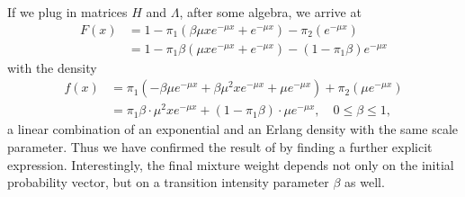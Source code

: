 \documentclass[11pt]{article}
\begin{document}
If we plug in matrices $H$ and $\Lambda$, after some algebra, we arrive at
\begin{align} 
\nonumber    F(x)&=1-\pi_1(\beta\mu xe^{-\mu x}+e^{-\mu x})-\pi_2(e^{-\mu x})   \\
\label{F.case1}    &  =1-\pi_1\beta (\mu xe^{-\mu x}+e^{-\mu x})-(1-\pi_1 \beta)e^{-\mu x}
\end{align}
with the density
\begin{align}
\nonumber f(x)&=\pi_1(-\beta\mu e^{-\mu x}+\beta\mu^2 x e^{-\mu x} +\mu e^{-\mu x})+\pi_2(\mu e^{-\mu x})     \\
\label{f.case1}    & =\pi_1\beta \cdot \mu^2 x e^{-\mu x} +(1-\pi_1 \beta)\cdot \mu e^{-\mu x}, \quad 0\le \beta \le 1,
\end{align}
 a linear combination of an exponential and an Erlang density with the same scale parameter.  Thus we have confirmed the result of \cite{Dicks+Hipp:00a} by finding a further explicit expression. Interestingly, the final mixture weight depends not only on the initial probability vector, but on a transition intensity parameter $\beta$ as well. \\ 
\end{document}

